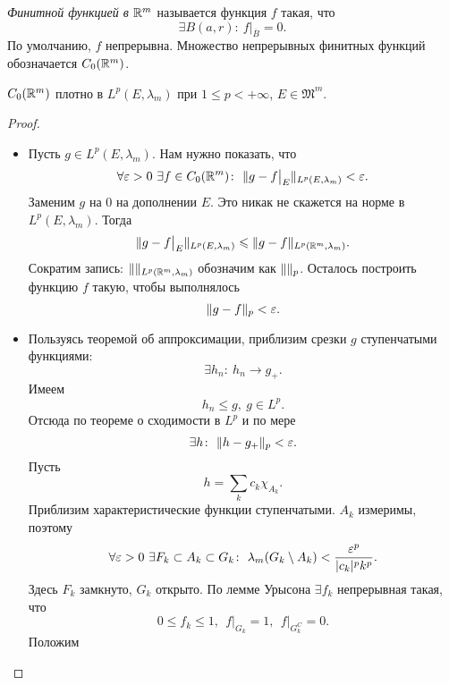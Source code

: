 \begin{definition}
    \textit{Финитной функцией в $\mathbb{R}^m$} называется функция $f$ такая, что
\[
    \exists B(a, r)\colon~ f\big|_{\overline{B}} = 0
.\] 
    По умолчанию, $f$ непрерывна. Множество непрерывных финитных функций
    обозначается $C_0(\mathbb{R}^m)$.
\end{definition}

\begin{theorem}
    $C_0(\mathbb{R}^m)$ плотно в $L^p(E, \lambda_m)$ при $1 \leqslant p < +\infty$,
    $E \in \mathfrak{M}^m$.
\end{theorem}
\begin{proof}
    \enewline
    \begin{itemize}
        \item Пусть $g \in L^p(E, \lambda_m)$. Нам нужно показать, что
            \[
                \forall \varepsilon > 0~ \exists f \in C_0(\mathbb{R}^m) \colon~ \lVert g - f\big|_E\rVert_
                {L^p(E, \lambda_m)} < \varepsilon
            .\]
            Заменим $g$ на $0$ на дополнении $E$. Это никак не скажется на норме в
            $L^p(E, \lambda_m)$. Тогда
            \[
                \lVert g - f\big|_E\rVert_{L^p(E, \lambda_m)} \leqslant \lVert g - f\rVert_
                {L^p(\mathbb{R}^m, \lambda_m)}
            .\]
            Сократим запись: $\lVert\rVert_{L^p(\mathbb{R}^m, \lambda_m)}$ обозначим как 
            $\lVert\rVert_p$. Осталось построить функцию $f$ такую, чтобы выполнялось
            \[
                \lVert g - f\rVert_p < \varepsilon
            .\]
        \item Пользуясь теоремой об аппроксимации, приблизим срезки $g$
            ступенчатыми функциями:
            \[
                \exists h_n \colon~ h_n \to g_+
            .\]
            Имеем
            \[
                h_n \leqslant g,~ g \in L^p
            .\]
            Отсюда по теореме о сходимости в $L^p$ и по мере
            \[
                \exists h \colon~ \lVert h - g_+\rVert_p < \varepsilon    
            .\]
            Пусть
            \[
                h = \sum_k{c_k \chi_{A_k}}
            .\]
            Приблизим характеристические функции ступенчатыми. $A_k$ измеримы,
            поэтому
            \[
                \forall \varepsilon > 0~ \exists F_k \subset A_k \subset G_k \colon~
                \lambda_m(G_k \setminus A_k) < \frac{\varepsilon^p}{|c_k|^p k^p}
            .\]
            Здесь $F_k$ замкнуто, $G_k$ открыто. По лемме Урысона $\exists f_k$
            непрерывная такая, что
            \[
                0 \leqslant f_k \leqslant 1,~~ f\big|_{G_k} = 1,~~
                f\big|_{G_k^C} = 0
            .\]
            Положим

\end{itemize}
\end{proof}
